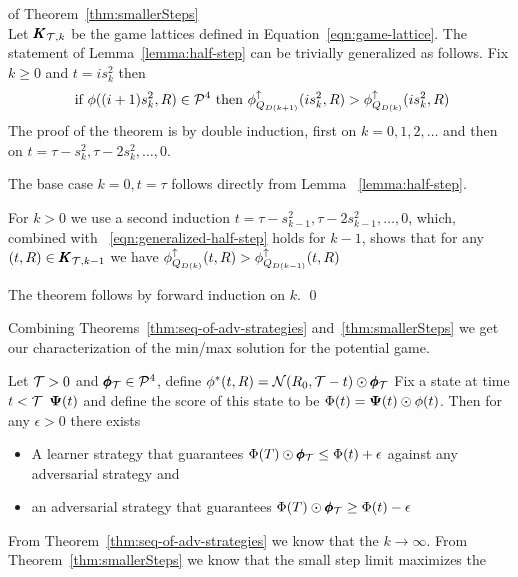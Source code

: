 \documentclass{article}[12pt]
\begin{document}
\proof  of Theorem~\ref{thm:smallerSteps} \\

Let $ \pmb{K}_{{\mathcal{T},k}}$ be the game lattices defined in
Equation~\ref{eqn:game-lattice}. The statement of
Lemma~\ref{lemma:half-step} can be trivially generalized as follows. Fix $k\geq 0$ and $t=i s_k^2$
then 
\begin{equation} \label{eqn:generalized-half-step}
  \mbox{ if } \phi((i+1) s_k^2,R) \in {\cal P}^{4} \mbox{ then }
  \phi_{Q_{D(k+1)}}^{\uparrow}(i s_k^2,R) >  \phi_{Q_{D(k)}}^{\uparrow}(i s_k^2,R)
\end{equation}
The proof of the theorem is by double induction, first on $k=0,1,2,\ldots$ and then on
$t=\tau-s_k^2,\tau-2s_k^2,\ldots,0$.

The base case $k=0,t=\tau$ follows directly from Lemma ~\ref{lemma:half-step}.

For $k>0$ we use a second induction $t=\tau-s_{k-1}^2,\tau-2s_{k-1}^2,\ldots,0$, which, combined with 
~\ref{eqn:generalized-half-step} holds for $k-1$, shows that for any $(t,R) \in \pmb{K}_{{\mathcal{T},k-1}}$
we have $ \phi_{Q_{D(k)}}^{\uparrow}(t,R) >  \phi_{Q_{D(k-1)}}^{\uparrow}(t,R)$


The theorem follows by forward induction on $k$.
\qed

Combining Theorems~\ref{thm:seq-of-adv-strategies}
and~\ref{thm:smallerSteps} we get our characterization of the min/max
solution for the potential game.

\begin{theorem} \label{thm:min-max-limit}
Let $\mathcal{T}>0$ and $\pmb{\phi}_{\mathcal{T}} \in {\cal P}^{4}$, define $\phi^*(t,R) = {\cal N}(R_0,\mathcal{T}-t) \odot \pmb{\phi}_{\mathcal{T}}$
Fix a state at time $t<\mathcal{T}$ ${\bf \Psi}(t)$ and define the score of this state
to be $\Phi(t) = {\bf \Psi}(t) \odot \phi(t)$. Then for any $\epsilon>0$ there exists
\begin{itemize}
\item A learner strategy that guarantees $\Phi(T) \odot \pmb{\phi}_{\mathcal{T}} \leq \Phi(t)+\epsilon$ against any adversarial strategy and
  \item an adversarial strategy that guarantees  $\Phi(T) \odot \pmb{\phi}_{\mathcal{T}} \geq \Phi(t)-\epsilon$
\end{itemize}
\end{theorem}
\proof
From Theorem~\ref{thm:seq-of-adv-strategies} we know that the  $k \to \infty$.
From Theorem~\ref{thm:smallerSteps} we know that the small step limit maximizes the 
\end{document}
